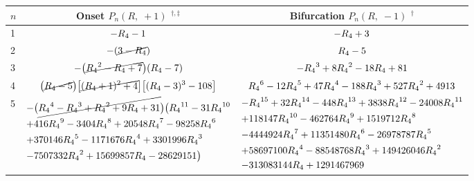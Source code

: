 \documentclass{ws-ijbc}
\begin{document}
\begin{table}[h]\footnotesize
{
\label{tab:Pnlog}
\begin{tabular}{lcc}
\hline
  $n$
& Onset $P_n(R, \; +1)$ $^{\dagger, \ddagger}$
& Bifurcation $P_n(R, \; -1)$ $^\dagger$
\\
\hline
1
&
$-{R_4}-1$
&
$-{R_4}+3$
\\
2
&
$-(\cancel{3-{R_4}})$
&
${R_4}-5$
\\
3
&
$\begin{aligned}
-
\big( \cancel{
  {R_4}^2-{R_4}+7
}\big)
  ({R_4}-7)
\end{aligned}$
&
$\begin{aligned}
 - {R_4}^3 + 8{R_4}^2 - 18{R_4} + 81
\end{aligned}$
\\
4
&
$\begin{aligned}
\big( \cancel{
  {R_4} - 5
} \big)
\big[ \cancel{
  ({R_4}+1)^2 + 4
} \big]
\big[
  ({R_4}-3)^3 - 108
\big]
\end{aligned}$

&

$
{R_4}^6-12 {R_4}^5+47 {R_4}^4-188 {R_4}^3+527 {R_4}^2+4913
$
\\
5

&

\begin{minipage}{.48\linewidth}
$\begin{aligned}
-
&\big( \cancel{
{R_4}^4-{R_4}^3+{R_4}^2+9 {R_4}+31
} \big)
\big(
{R_4}^{11}-31 {R_4}^{10} \\
+&416 {R_4}^9 -3404 {R_4}^8 +20548 {R_4}^7-98258 {R_4}^6 \\
+&370146 {R_4}^5 -1171676 {R_4}^4 +3301996 {R_4}^3\\
-&7507332 {R_4}^2+15699857 {R_4}-28629151
\big)
\end{aligned}$
\end{minipage}

&

\begin{minipage}{.49\linewidth}
\vspace{1mm}
$\begin{aligned}
-&{R_4}^{15}+32 {R_4}^{14}-448 {R_4}^{13}+3838 {R_4}^{12}-24008 {R_4}^{11}\\
+&118147 {R_4}^{10} -462764 {R_4}^9+1519712 {R_4}^8\\
-&4444924 {R_4}^7 +11351480 {R_4}^6 -26978787 {R_4}^5\\
+&58697100 {R_4}^4 -88548768 {R_4}^3+149426046 {R_4}^2\\
-&313083144 {R_4} +1291467969
\end{aligned}$
\vspace{1mm}
\end{minipage}


\end{tabular}}
\end{table}
\end{document}
